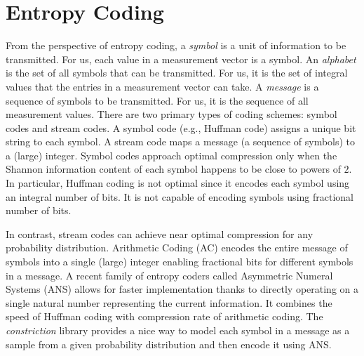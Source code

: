 \section{Entropy Coding}
\label{appsec:ec}
From the perspective of entropy coding, a \emph{symbol}
is a unit of information to be transmitted. For us,
each value in a measurement vector is a symbol.
An \emph{alphabet} is the set of all symbols that
can be transmitted. For us, it is the set of integral
values that the entries in a measurement vector can take.
A \emph{message} is a sequence of symbols to be transmitted.
For us, it is the sequence of all measurement values.
There are two primary types of coding schemes: symbol
codes and stream codes. A symbol code (e.g., Huffman code)
assigns a unique bit string to each symbol.
A stream code maps a message (a sequence of symbols)
to a (large) integer. Symbol codes approach optimal
compression only when the Shannon information content
of each symbol happens to be close to powers of $2$.
In particular, Huffman coding is not optimal
since it encodes each symbol using an integral
number of bits. It is not capable of encoding symbols using
fractional number of bits.

In contrast, stream codes can achieve near optimal
compression for any probability distribution.
Arithmetic Coding (AC) \cite{rissanen1979arithmetic,witten1987arithmetic}
encodes the entire message of symbols into a single (large) integer
enabling fractional bits for different symbols in a message.
A recent family of entropy coders called Asymmetric Numeral Systems (ANS)
\cite{duda2013asymmetric}
allows for faster implementation
thanks to directly operating
on a single natural number representing the current information.
It combines the speed of Huffman coding with compression rate
of arithmetic coding.
The \emph{constriction} library \cite{bamler2022constriction} provides
a nice way to model each symbol in a message as a sample from
a given probability distribution and then encode it using ANS.


